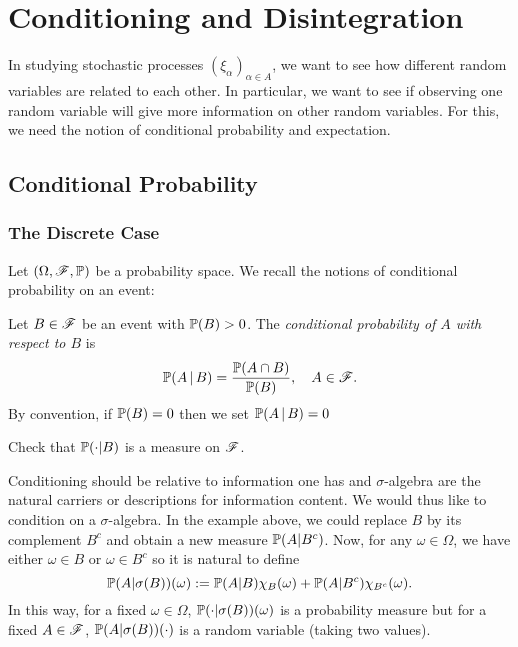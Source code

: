 \section{Conditioning and Disintegration}
In studying stochastic processes $(\xi_\alpha)_{\alpha \in A}$, we want to see how different random variables are related to each other. In particular, we want to see if observing one random variable will give more information on other random variables. For this, we need the notion of conditional probability and expectation.

\subsection{Conditional Probability}
\subsubsection{The Discrete Case}
Let $(\Omega, \mathcal{F}, \mathbb{P})$ be a probability space. We recall the notions of conditional probability on an event: 

\begin{definition}
Let $B \in \mathcal{F}$ be an event with $\mathbb{P}(B) > 0$. The \textit{conditional probability of $A$ with respect to $B$} is 
\begin{equation}
    \mathbb{P}(A \,|\, B) = \frac{\mathbb{P}(A \cap B)}{\mathbb{P}(B)}, \quad A\in \mathcal{F}.
\end{equation}
By convention, if $\mathbb{P}(B) = 0$ then we set $\mathbb{P}(A \,|\, B) = 0$
\end{definition}

\begin{exercise}
Check that $\mathbb{P}(\cdot | B)$ is a measure on $\mathcal{F}$.
\end{exercise}

Conditioning should be relative to information one has and $\sigma$-algebra are the natural carriers or descriptions for information content. We would thus like to condition on a $\sigma$-algebra. In the example above, we could replace $B$ by its complement $B^c$ and obtain a new measure $\mathbb{P}(A|B^c)$. Now, for any $\omega \in \Omega$, we have either $\omega \in B$ or $\omega \in B^c$ so it is natural to define
\begin{equation}
    \mathbb{P}(A | \sigma(B))(\omega) := \mathbb{P}(A|B)\chi_B(\omega) + \mathbb{P}(A | B^c)\chi_{B^c}(\omega).
\end{equation}
In this way, for a fixed $\omega \in \Omega$, $\mathbb{P}(\cdot | \sigma(B))(\omega)$ is a probability measure but for a fixed $A\in \mathcal{F}$, $\mathbb{P}(A|\sigma(B))(\cdot)$ is a random variable (taking two values).\\

